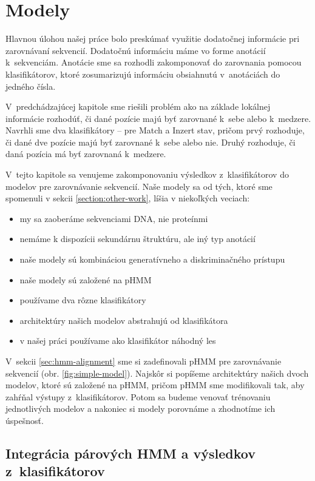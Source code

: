 \chapter{Modely}
\label{chap:models}

Hlavnou úlohou našej práce bolo preskúmať využitie dodatočnej informácie pri zarovnávaní sekvencií. Dodatočnú informáciu máme vo forme anotácií k~sekvenciám. Anotácie sme sa rozhodli zakomponovať do zarovnania pomocou klasifikátorov, ktoré zosumarizujú informáciu obsiahnutú v~anotáciách do jedného čísla.

V~predchádzajúcej kapitole sme riešili problém ako na základe lokálnej informácie rozhodúť, či dané pozície majú byť zarovnané k~sebe alebo k~medzere. Navrhli sme dva klasifikátory -- pre Match a Inzert stav, pričom prvý rozhoduje, či dané dve pozície majú byť zarovnané k~sebe alebo nie. Druhý rozhoduje, či daná pozícia má byť zarovnaná k~medzere.

V~tejto kapitole sa venujeme zakomponovaniu výsledkov z~klasifikátorov do modelov pre zarovnávanie sekvencií.
Naše modely sa od tých, ktoré sme spomenuli v sekcii \ref{section:other-work}, líšia v niekoľkých veciach:
\begin{itemize}
    \item my sa zaoberáme sekvenciami DNA, nie proteínmi
    \item nemáme k dispozícii sekundárnu štruktúru, ale iný typ anotácií
    \item naše modely sú kombináciou generatívneho a diskriminačného prístupu
    \item naše modely sú založené na pHMM
    \item používame dva rôzne klasifikátory
    \item architektúry našich modelov abstrahujú od klasifikátora
    \item v našej práci používame ako klasifikátor náhodný les
\end{itemize}
V~sekcii \ref{sec:hmm-alignment} sme si zadefinovali pHMM pre zarovnávanie sekvencií (obr. \ref{fig:simple-model}).
Najskôr si popíšeme architektúry našich dvoch modelov, ktoré sú založené na pHMM, pričom pHMM sme modifikovali tak, aby zahŕňal výstupy z~klasifikátorov. Potom sa budeme venovať trénovaniu jednotlivých modelov a nakoniec si modely porovnáme a zhodnotíme ich úspešnosť.

\section[Integrácia pHMM a klasifikátorov]{Integrácia párových HMM a výsledkov z~klasifikátorov}

